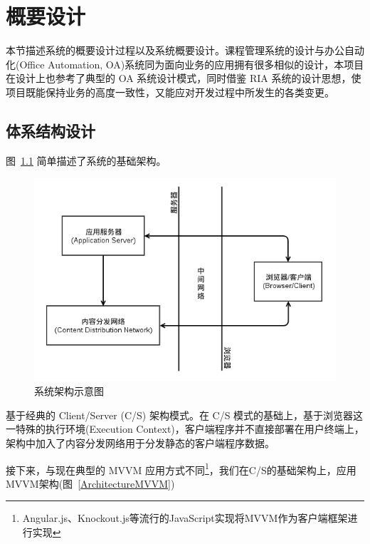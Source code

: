 \chapter{概要设计}

本节描述系统的概要设计过程以及系统概要设计。课程管理系统的设计与办公自动化(Office Automation, OA)系统同为面向业务的应用拥有很多相似的设计，本项目在设计上也参考了典型的 OA 系统设计模式，同时借鉴 RIA 系统的设计思想，使项目既能保持业务的高度一致性，又能应对开发过程中所发生的各类变更。

\section{体系结构设计}

图~\ref{Architecture} 简单描述了系统的基础架构。

\begin{figure}[!h]
  \begin{center}
    \includegraphics[scale=0.5]{figures/diagram-architecture.png}
    \caption{系统架构示意图\label{Architecture}}
  \end{center}
\end{figure}

基于经典的 Client/Server (C/S) 架构模式。在 C/S 模式的基础上，基于浏览器这一特殊的执行环境(Execution Context)，客户端程序并不直接部署在用户终端上，架构中加入了内容分发网络用于分发静态的客户端程序数据。

接下来，与现在典型的 MVVM 应用方式不同\footnote{Angular.js、Knockout.js等流行的JavaScript实现将MVVM作为客户端框架进行实现}，我们在C/S的基础架构上，应用MVVM架构(图~\ref{ArchitectureMVVM})

